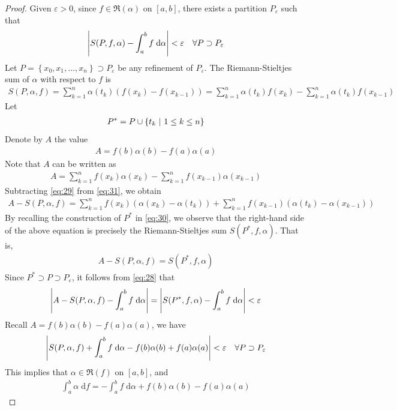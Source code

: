 \documentclass[thmcnt=section, 12pt]{my-elegantbook}
\begin{document}
\begin{proof}
    Given $\varepsilon > 0$, since $f \in \mathfrak{R}(\alpha)$ on $[a, b]$, there exists a partition $P_\varepsilon$ such that 
    \begin{align}
        \left\lvert S(P, f, \alpha) - \int_a^b f \; \mathrm{d}\alpha \right\rvert < \varepsilon
        \quad \forall P \supset P_\varepsilon
        \label{eq:28}
    \end{align}
    Let $P = \left\{x_0, x_1, \ldots, x_n\right\} \supset P_\varepsilon$ be any refinement of $P_\varepsilon$. The Riemann-Stieltjes sum of $\alpha$ with respect to $f$ is 
    \begin{align}
        S(P, \alpha, f)
        = \sum_{k=1}^n \alpha(t_k) (f(x_k) - f(x_{k-1}))
        = \sum_{k=1}^n \alpha(t_k) f(x_k)
        - \sum_{k=1}^n \alpha(t_k) f(x_{k-1})
        \label{eq:29}
    \end{align}
    Let 
    \begin{align}
        P^\ast = P \cup \left\{ t_k \ \middle| \ 1 \leq k \leq n \right\}
        \label{eq:30}
    \end{align}
    Denote by $A$ the value 
    \begin{align*}
        A = f(b)\alpha(b) - f(a)\alpha(a)
    \end{align*}
    Note that $A$ can be written as 
    \begin{align}
        A = \sum_{k=1}^n f(x_k) \alpha(x_k)
        - \sum_{k=1}^n f(x_{k-1}) \alpha(x_{k-1})
        \label{eq:31}
    \end{align}
    Subtracting \eqref{eq:29} from \eqref{eq:31}, we obtain
    \begin{align*}
        A - S(P, \alpha, f)
        = \sum_{k=1}^n f(x_k) (\alpha(x_k) - \alpha(t_k))
        + \sum_{k=1}^n f(x_{k-1}) (\alpha(t_k) - \alpha(x_{k-1}))
    \end{align*}
    By recalling the construction of $P^\ast$ in \eqref{eq:30}, we observe that the right-hand side of the above equation is precisely the Riemann-Stieltjes sum $S(P^\ast, f, \alpha)$. That is, 
    \begin{align*}
        A - S(P, \alpha, f) = S(P^\ast, f, \alpha)
    \end{align*}
    Since $P^\ast \supset P \supset P_\varepsilon$, it follows from \eqref{eq:28} that 
    \begin{align*}
        \left\lvert A - S(P, \alpha, f) - \int_a^b f \; \mathrm{d}\alpha \right\rvert 
        = \left\lvert S(P^\ast, f, \alpha) - \int_a^b f \; \mathrm{d}\alpha \right\rvert
        < \varepsilon
    \end{align*}
    Recall $A = f(b)\alpha(b) - f(a)\alpha(a)$, we have 
    \begin{align*}
        \left\lvert S(P, \alpha, f) + \int_a^b f \; \mathrm{d}\alpha - f(b)\alpha(b) + f(a)\alpha(a) \right\rvert < \varepsilon
        \quad \forall P \supset P_\varepsilon
    \end{align*}
    This implies that $\alpha \in \mathfrak{R}(f)$ on $[a, b]$, and 
    \begin{align*}
        \int_a^b \alpha \;\mathrm{d} f
        = -\int_a^b f \;\mathrm{d}\alpha 
        + f(b)\alpha(b) - f(a)\alpha(a)
    \end{align*}
\end{proof}
\end{document}
